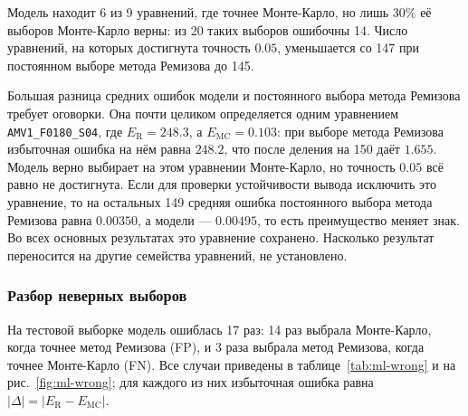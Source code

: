 \documentclass[14pt,a4paper]{extarticle}
\begin{document}
Модель находит 6 из 9 уравнений, где точнее Монте-Карло, но лишь 30\%
её выборов Монте-Карло верны: из 20 таких выборов ошибочны 14. Число
уравнений, на которых достигнута точность $0.05$, уменьшается со 147
при постоянном выборе метода Ремизова до 145.

Большая разница средних ошибок модели и постоянного выбора метода
Ремизова требует оговорки. Она почти целиком определяется одним
уравнением \texttt{AMV1\_F0180\_S04}, где $E_{\mathrm{R}}=248.3$,
а $E_{\mathrm{MC}}=0.103$: при выборе метода Ремизова избыточная ошибка
на нём равна $248.2$, что после деления на 150 даёт $1.655$. Модель верно
выбирает на этом уравнении Монте-Карло, но точность $0.05$ всё равно
не достигнута. Если для проверки устойчивости вывода исключить это
уравнение, то на остальных 149 средняя ошибка постоянного выбора метода
Ремизова равна $0.00350$, а модели --- $0.00495$, то есть преимущество
меняет знак. Во всех основных результатах это уравнение сохранено.
Насколько результат переносится на другие семейства уравнений,
не установлено.

\subsubsection{Разбор неверных выборов}
На тестовой выборке модель ошиблась 17 раз: 14 раз выбрала Монте-Карло,
когда точнее метод Ремизова (FP), и 3 раза выбрала метод Ремизова, когда
точнее Монте-Карло (FN). Все случаи приведены
в таблице~\ref{tab:ml-wrong} и на рис.~\ref{fig:ml-wrong}; для каждого
из них избыточная ошибка равна $|\Delta|=|E_{\mathrm{R}}-E_{\mathrm{MC}}|$.
\end{document}

